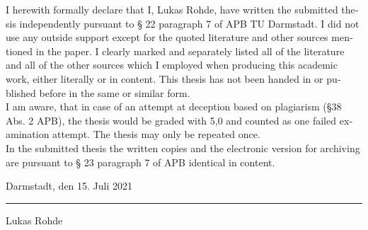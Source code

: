 \documentclass[11pt,longdoc,accentcolor=tud1b,paper=a4]{tuddesign/tudreport}
\newcounter{dummy} %
\newcommand{\komName}{Lukas Rohde\xspace}
\newcommand{\komSubmissionDate}{15. Juli 2021\xspace}%
\begin{document}
\begin{otherlanguage}{ngerman}
{	\noindent I herewith formally declare that I, \komName, have written the submitted thesis independently pursuant to § 22 paragraph 7 of APB TU Darmstadt. 
	I did not use any outside support except for the quoted literature and other sources mentioned in the paper. 
	I clearly marked and separately listed all of the literature and all of the other sources which I employed when producing this academic work, either literally or in content.
	This thesis has not been handed in or published before in the same or similar form. \\

	\noindent I am aware, that in case of an attempt at deception based on plagiarism (§38 Abs. 2 APB), the thesis would be graded with 5,0 and counted as one failed examination attempt. 
	The thesis may only be repeated once. \\
	
    \noindent In the submitted thesis the written copies and the electronic version for archiving are pursuant to § 23 paragraph 7 of APB identical in content.
    
	}{}	
    \vspace{4em}
    
    \noindent Darmstadt, den \komSubmissionDate 
    
    \vspace{3em}
    
    \noindent\rule{5cm}{0.4pt}
    
    \noindent\komName
    
    \end{otherlanguage}
   
	\tableofcontents
	\listoffigures
	
	\cleardoublepage

	
	
	
	
	
\end{document}
